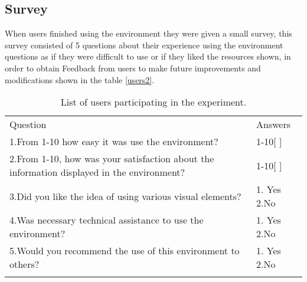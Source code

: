 \subsection{Survey}

When users finished using the environment they were given a small survey, this survey consisted of 5 questions about their experience using the environment questions as if they were difficult to use or if they liked the resources shown, in order to obtain Feedback from users to make future improvements and modifications shown in the table \ref{users2}.

\begin{table}
\small
\centering
\captionsetup{font=footnotesize}
\caption{List of users participating in the experiment.}
\label{tab:users2} 

\small
\begin{tabular}{p{12cm} p{4cm} }
\hline\noalign{\smallskip} 
Question & Answers \\
\noalign{\smallskip}\hline\noalign{\smallskip}\hline
\small{1.From 1-10 how easy it was use the environment? } & \small{1-10[  ]} \\ \hline  
\small{2.From 1-10, how was your satisfaction about the information displayed in the environment? } & \small{1-10[  ]} \\ \hline
\small{3.Did you like the idea of using various visual elements?  } & \small{1. Yes 2.No} \\ \hline 
\small{4.Was necessary technical assistance to use the environment?   } & \small{1. Yes 2.No} \\ \hline   
\small{5.Would you recommend the use of this environment to others?  } & \small{1. Yes 2.No} \\ \hline 
\hline
\noalign{\smallskip}\hline
\end{tabular}
\end{table}

